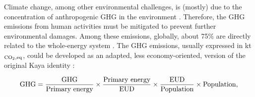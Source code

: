 Climate change, among other environmental challenges, is (mostly) due to the concentration of anthropogenic \acrfull{GHG} in the environment \cite{IPCC_CO2_budget}. Therefore, the \gls{GHG} emissions from human activities must be mitigated to prevent further environmental damages. Among these emissions, globally, about 75\% are directly related to the whole-energy system \cite{ourworldindata_CO2_world}. The \gls{GHG} emissions, usually expressed in kt$_{\ce{CO2},\text{eq}}$, could be developed as an adapted, \ie less economy-oriented, version of the original Kaya identity \cite{kaya1997environment}:

\begin{equation}
\label{eq:equality_GHG}
\mathrm{GHG} =  \frac{\mathrm{GHG}}{\text{Primary energy}} \times \frac{\text{Primary energy}}{\mathrm{EUD}}\times \frac{\mathrm{EUD}}{\text{Population}} \times \text{Population,}\\
 \end{equation}

